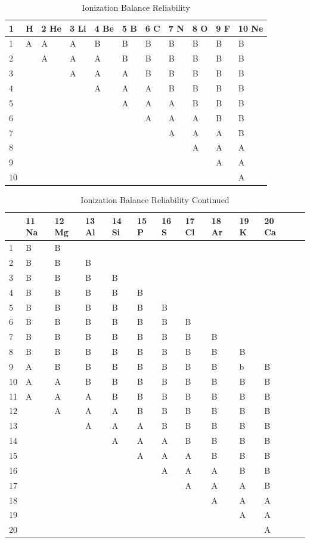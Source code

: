 \begin{table}
\caption{Ionization Balance Reliability}
\label{tab:IonizationBalanceReliability}
\begin{tabular}{lllllllllll}
\hline
1& H&2 He&3 Li&4 Be&5 B&6 C&7 N&8 O&9 F&10 Ne\\
\hline
1&A&A&A&B&B&B&B&B&B&B\\
2&& A&A&A&B&B&B&B&B&B\\
3&&&A&A&A&B&B&B&B&B\\
4&&&&A&A&A&B&B&B&B\\
5&&&&&A&A&A&B&B&B\\
6&&&&&&A&A&A&B&B\\
7&&&&&&&A&A&A&B\\
8&&&&&&&&A&A&A\\
9&&&&&&&&&A&A\\
10&&&&&&&&&&A\\
\hline
\end{tabular}
\end{table}


\begin{table}
\caption{Ionization Balance Reliability Continued}
\begin{tabular}{lllllllllllll}
\hline
&11 Na&12 Mg&13 Al&14 Si&15 P&16 S&17 Cl&18 Ar&19 K&20 Ca\\
\hline
1&B&B\\
2&B&B&B\\
3&B&B&B&B\\
4&B&B&B&B&B\\
5&B&B&B&B&B&B\\
6&B&B&B&B&B&B&B\\
7&B&B&B&B&B&B&B&B\\
8&B&B&B&B&B&B&B&B&B\\
9&A&B&B&B&B&B&B&B&b&B\\
10&A&A&B&B&B&B&B&B&B&B\\
11&A&A&A&B&B&B&B&B&B&B\\
12&&A&A&A&B&B&B&B&B&B\\
13&&&A&A&A&B&B&B&B&B\\
14&&&&A&A&A&B&B&B&B\\
15&&&&&A&A&A&B&B&B\\
16&&&&&&A&A&A&B&B\\
17&&&&&&&A&A&A&B\\
18&&&&&&&&A&A&A\\
19&&&&&&&&&A&A\\
20&&&&&&&&&&A\\
\hline
\end{tabular}
\end{table}


